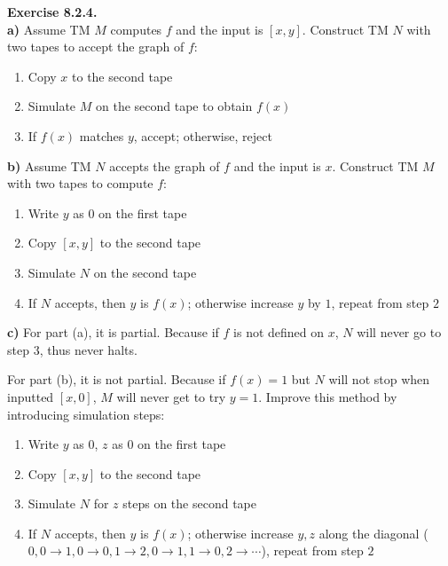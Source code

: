 \documentclass[a4paper]{article}
\newenvironment{exercise}[1]{
	\par
	\noindent\textbf{Exercise #1.}\quad
}{
	\par
	\bigskip
}
\begin{document}
\begin{exercise}{8.2.4} \hspace{0pt}\\
\textbf{a)} Assume TM $M$ computes $f$ and the input is $[x,y]$.
    Construct TM $N$ with two tapes to accept the graph of $f$:
    \begin{enumerate}
        \item Copy $x$ to the second tape
        \item Simulate $M$ on the second tape to obtain $f(x)$
        \item If $f(x)$ matches $y$, accept; otherwise, reject
    \end{enumerate}
\textbf{b)} Assume TM $N$ accepts the graph of $f$ and the input is $x$.
    Construct TM $M$ with two tapes to compute $f$:
    \begin{enumerate}
        \item Write $y$ as $0$ on the first tape
        \item Copy $[x,y]$ to the second tape
        \item Simulate $N$ on the second tape
        \item If $N$ accepts, then $y$ is $f(x)$; otherwise increase $y$ by $1$, repeat from step $2$
    \end{enumerate}
\textbf{c)} For part (a), it is partial. Because if $f$ is not defined on $x$, $N$ will never
    go to step $3$, thus never halts.\par
    For part (b), it is not partial. Because if $f(x)=1$ but $N$ will not stop when inputted $[x,0]$,
    $M$ will never get to try $y=1$. Improve this method by introducing simulation steps:
    \begin{enumerate}
        \item Write $y$ as $0$, $z$ as $0$ on the first tape
        \item Copy $[x,y]$ to the second tape
        \item Simulate $N$ for $z$ steps on the second tape
        \item If $N$ accepts, then $y$ is $f(x)$; otherwise increase $y,z$ along the diagonal
            ($0,0\to 1,0\to 0,1\to 2,0\to 1,1\to 0,2\to\cdots$), repeat from step $2$
    \end{enumerate}
\end{exercise}
\end{document}
